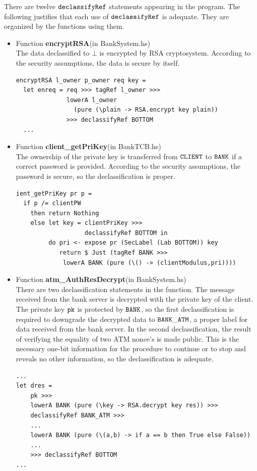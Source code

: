 \documentclass[a4paper]{report}
\newcommand{\co}[1]{$\cod{#1}$}
\begin{document}
There are twelve \co{declassifyRef} statements appearing in the program. The following justifies that each use 
of \co{declassifyRef} is adequate. They are organized by the functions using them.
\begin{itemize}
\item Function \textbf{encryptRSA}(in BankSystem.hs) \\
      The data declassified to $\bot$ is encrypted by RSA cryptosystem. According to the security
      assumptions, the data is secure by itself.
\begin{Verbatim}[fontsize=\footnotesize]
encryptRSA l_owner p_owner req key =
  let enreq = req >>> tagRef l_owner >>> 
              lowerA l_owner 
                (pure (\plain -> RSA.encrypt key plain))
              >>> declassifyRef BOTTOM
  ...
\end{Verbatim}

\item Function \textbf{client\_getPriKey}(in BankTCB.hs) \\
      The ownership of the private key is transferred from \co{CLIENT} to \co{BANK} if a correct password
      is provided. According to the security assumptions, the password is secure, so the declassification
      is proper.
\begin{Verbatim}[fontsize=\footnotesize]
ient_getPriKey pr p =
  if p /= clientPW
    then return Nothing
    else let key = clientPriKey >>> 
                   declassifyRef BOTTOM in
         do pri <- expose pr (SecLabel (Lab BOTTOM)) key
            return $ Just (tagRef BANK >>> 
             lowerA BANK (pure (\() -> (clientModulus,pri))))
\end{Verbatim}

\item Function \textbf{atm\_AuthResDecrypt}(in BankSystem.hs) \\
      There are two declassification statements in the function. The message received from the bank server is decrypted with
      the private key of the client. The private key \co{pk} is protected by \co{BANK}, so the first declassification 
      is required to downgrade the decrypted data to \co{BANK\_ATM}, a proper label for data received from the 
      bank server. In the second declassification, the result of verifying the equality of two ATM nonce's is made
      public. This is the necessary one-bit information for the procedure to continue or to stop and reveals no 
      other information, so the declassification is adequate.
\begin{Verbatim}[fontsize=\footnotesize]
...
let dres = 
    pk >>>
    lowerA BANK (pure (\key -> RSA.decrypt key res)) >>>
    declassifyRef BANK_ATM >>>
    ...
    lowerA BANK (pure (\(a,b) -> if a == b then True else False))
    ...
    >>> declassifyRef BOTTOM
...
\end{Verbatim}


\end{itemize}
\end{document}
